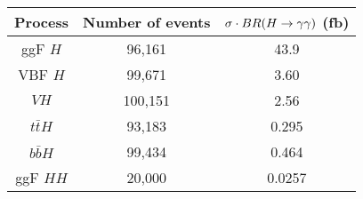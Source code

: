 \begin{tabular}{|c|c|c|}
\hline
Process & Number of events & $\sigma \cdot BR(H\to\gamma\gamma)$ (fb) \\
\hline
ggF $H$ & 96,161 & 43.9 \\
VBF $H$ & 99,671 & 3.60 \\
$VH$ & 100,151 & 2.56 \\
$t\bar{t}H$ & 93,183 & 0.295 \\
$b\bar{b}H$ & 99,434 & 0.464 \\
ggF $HH$ & 20,000 & 0.0257 \\
\hline
\end{tabular}
